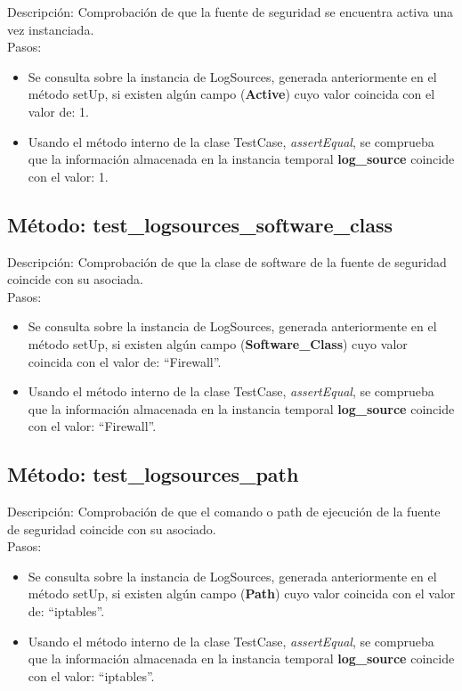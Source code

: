 Descripción: Comprobación de que la fuente de seguridad se encuentra activa una vez instanciada.\\
Pasos:
\begin{itemize}
\item Se consulta sobre la instancia de LogSources, generada anteriormente en el método setUp, si existen algún campo (\textbf{Active}) cuyo valor coincida con el valor de: 1.
\item Usando el método interno de la clase TestCase, \emph{assertEqual}, se comprueba que la información almacenada en la instancia temporal \textbf{log\_source} coincide con el valor: 1.
\end{itemize}



\subsection{\quad Método: test\_logsources\_software\_class}

Descripción: Comprobación de que la clase de software de la fuente de seguridad coincide con su asociada.\\
Pasos:
\begin{itemize}
\item Se consulta sobre la instancia de LogSources, generada anteriormente en el método setUp, si existen algún campo (\textbf{Software\_Class}) cuyo valor coincida con el valor de: ``Firewall''.
\item Usando el método interno de la clase TestCase, \emph{assertEqual}, se comprueba que la información almacenada en la instancia temporal \textbf{log\_source} coincide con el valor: ``Firewall''.
\end{itemize}



\subsection{\quad Método: test\_logsources\_path}

Descripción: Comprobación de que el comando o path de ejecución de la fuente de seguridad coincide con su asociado.\\
Pasos:
\begin{itemize}
\item Se consulta sobre la instancia de LogSources, generada anteriormente en el método setUp, si existen algún campo (\textbf{Path}) cuyo valor coincida con el valor de: ``iptables''.
\item Usando el método interno de la clase TestCase, \emph{assertEqual}, se comprueba que la información almacenada en la instancia temporal \textbf{log\_source} coincide con el valor: ``iptables''.
\end{itemize}

